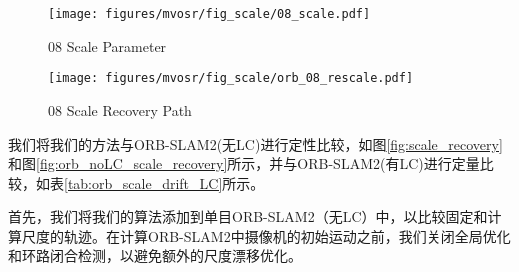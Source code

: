 \begin{figure*}[t]
\begin{subfigure}[b]{0.23\textwidth}
            \end{subfigure}
            \begin{subfigure}[b]{0.23\textwidth}
                \texttt{[image: figures/mvosr/fig\_scale/08\_scale.pdf]}
                \label{fig:scale_08}
                \caption{08 Scale Parameter}
                \end{subfigure}
                \begin{subfigure}[b]{0.23\textwidth}
                    \texttt{[image: figures/mvosr/fig\_scale/orb\_08\_rescale.pdf]}
                    \label{fig:scaled_path_08}
                    \caption{08 Scale Recovery Path}
                    \vspace*{1mm}
                    \end{subfigure}
    \caption{在KITTI数据集序列00、02、05、08上与无LC的ORB-SLAM2的尺度恢复性能比较。第一列中三个图像是没有环路闭合检测的单目ORB-SLAM2轨迹，显然尺度发生了明显的错误。第二列为对应序列的前100帧通过7-dof尺度校正得到的轨迹。第四列是第一列图像与我们估计的尺度参数（第三列）相运算得到的轨迹。}
    {\label{fig:scale_recovery}}
\end{figure*}

我们将我们的方法与ORB-SLAM2(无LC)进行定性比较，如图\ref{fig:scale_recovery}和图\ref{fig:orb_noLC_scale_recovery}所示，并与ORB-SLAM2(有LC)进行定量比较，如表\ref{tab:orb_scale_drift_LC}所示。

首先，我们将我们的算法添加到单目ORB-SLAM2（无LC）中，以比较固定和计算尺度的轨迹。在计算ORB-SLAM2中摄像机的初始运动之前，我们关闭全局优化和环路闭合检测，以避免额外的尺度漂移优化。


